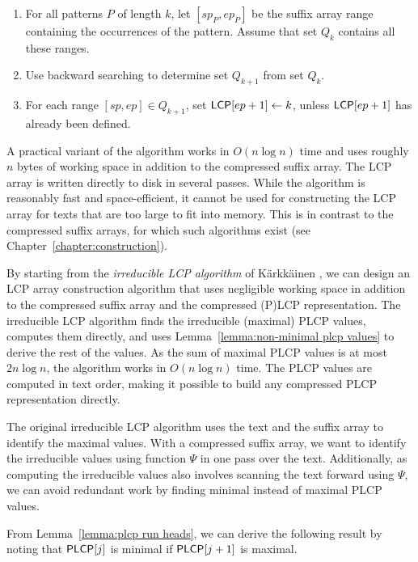 \begin{enumerate}

\item For all patterns $P$ of length $k$, let $[sp_{P}, ep_{P}]$ be the suffix array range containing the occurrences of the pattern. Assume that set $Q_{k}$ contains all these ranges.

\item Use backward searching to determine set $Q_{k+1}$ from set $Q_{k}$.

\item For each range $[sp, ep] \in Q_{k+1}$, set $\mathsf{LCP}[ep+1] \leftarrow k$, unless $\mathsf{LCP}[ep+1]$ has already been defined.

\end{enumerate}

A practical variant of the algorithm works in $O(n \log n)$ time and uses roughly $n$ bytes of working space in addition to the compressed suffix array. The LCP array is written directly to disk in several passes. While the algorithm is reasonably fast and space-efficient, it cannot be used for constructing the LCP array for texts that are too large to fit into memory. This is in contrast to the compressed suffix arrays, for which such algorithms exist (see Chapter~\ref{chapter:construction}).

By starting from the \emph{irreducible LCP algorithm} of Kärkkäinen , we can design an LCP array construction algorithm that uses negligible working space in addition to the compressed suffix array and the compressed (P)LCP representation. The irreducible LCP algorithm finds the irreducible (maximal) PLCP values, computes them directly, and uses Lemma~\ref{lemma:non-minimal plcp values} to derive the rest of the values. As the sum of maximal PLCP values is at most $2n \log n$, the algorithm works in $O(n \log n)$ time. The PLCP values are computed in text order, making it possible to build any compressed PLCP representation directly.

The original irreducible LCP algorithm uses the text and the suffix array to identify the maximal values. With a compressed suffix array, we want to identify the irreducible values using function $\Psi$ in one pass over the text. Additionally, as computing the irreducible values also involves scanning the text forward using $\Psi$, we can avoid redundant work by finding minimal instead of maximal PLCP values.

From Lemma~\ref{lemma:plcp run heads}, we can derive the following result by noting that $\mathsf{PLCP}[j]$ is minimal if $\mathsf{PLCP}[j+1]$ is maximal.

